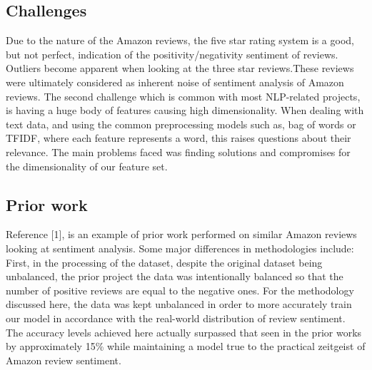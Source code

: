 \documentclass[conference]{IEEEtran}
\begin{document}
\subsection{Challenges}\label{AA}
Due to the nature of the Amazon reviews, the five star rating system is a good, but not perfect, indication of the positivity/negativity sentiment of reviews. Outliers become apparent when looking at the three star reviews.These reviews were ultimately considered as inherent noise of sentiment analysis of Amazon reviews. The second challenge which is common with most NLP-related projects, is having a huge body of features causing high dimensionality. When dealing with text data, and using the common preprocessing models such as, bag of words or TFIDF, where each feature represents a word, this raises questions about their relevance. The main problems faced was finding solutions and compromises for the dimensionality of our feature set.

\subsection{Prior work}
Reference [1], is an example of prior work performed on similar Amazon reviews looking at sentiment analysis. Some major differences in methodologies include: First, in the processing of the dataset, despite the original dataset being unbalanced, the prior project the data was intentionally balanced so that the number of positive reviews are equal to the negative ones. For the methodology discussed here, the data was kept unbalanced in order to more accurately train our model in accordance with the real-world distribution of review sentiment. The accuracy levels achieved here actually surpassed that seen in the prior works by approximately 15\% while maintaining a model true to the practical zeitgeist of Amazon review sentiment.
\end{document}
